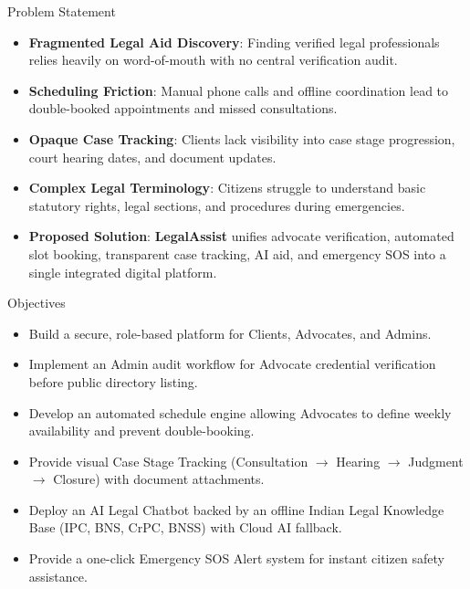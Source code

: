 \documentclass[10pt,aspectratio=169]{beamer}
\begin{document}
\begin{frame}{Problem Statement}
  \begin{itemize}
    \setlength{\itemsep}{12pt}
    \item \textbf{Fragmented Legal Aid Discovery}: Finding verified legal professionals relies heavily on word-of-mouth with no central verification audit.
    \item \textbf{Scheduling Friction}: Manual phone calls and offline coordination lead to double-booked appointments and missed consultations.
    \item \textbf{Opaque Case Tracking}: Clients lack visibility into case stage progression, court hearing dates, and document updates.
    \item \textbf{Complex Legal Terminology}: Citizens struggle to understand basic statutory rights, legal sections, and procedures during emergencies.
    \item \textbf{Proposed Solution}: \textbf{LegalAssist} unifies advocate verification, automated slot booking, transparent case tracking, AI aid, and emergency SOS into a single integrated digital platform.
  \end{itemize}
\end{frame}

\begin{frame}{Objectives}
  \begin{itemize}
    \setlength{\itemsep}{10pt}
    \item Build a secure, role-based platform for Clients, Advocates, and Admins.
    \item Implement an Admin audit workflow for Advocate credential verification before public directory listing.
    \item Develop an automated schedule engine allowing Advocates to define weekly availability and prevent double-booking.
    \item Provide visual Case Stage Tracking (Consultation $\rightarrow$ Hearing $\rightarrow$ Judgment $\rightarrow$ Closure) with document attachments.
    \item Deploy an AI Legal Chatbot backed by an offline Indian Legal Knowledge Base (IPC, BNS, CrPC, BNSS) with Cloud AI fallback.
    \item Provide a one-click Emergency SOS Alert system for instant citizen safety assistance.
  \end{itemize}
\end{frame}
\end{document}
